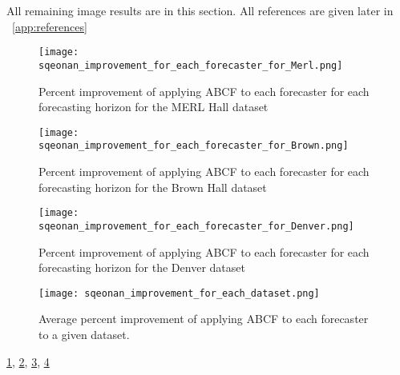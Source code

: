 \label{app:results}
All remaining image results are in this section.  All references are given later in ~\ref{app:references}

\begin{figure}
	\begin{center}
		\texttt{[image: sqeonan\_improvement\_for\_each\_forecaster\_for\_Merl.png]}
	\end{center}
	\caption{Percent improvement of applying ABCF to each forecaster for each forecasting horizon for the MERL Hall dataset}
	\label{fig:merl_sqeonan_improvement}
\end{figure}

\begin{figure}
	\begin{center}
		\texttt{[image: sqeonan\_improvement\_for\_each\_forecaster\_for\_Brown.png]}
	\end{center}
	\caption{Percent improvement of applying ABCF to each forecaster for each forecasting horizon for the Brown Hall dataset}
	\label{fig:brown_sqeonan_improvement}
\end{figure}

\begin{figure}
	\begin{center}
		\texttt{[image: sqeonan\_improvement\_for\_each\_forecaster\_for\_Denver.png]}
	\end{center}
	\caption{Percent improvement of applying ABCF to each forecaster for each forecasting horizon for the Denver dataset}
	\label{fig:denver_sqeonan_improvement}
\end{figure}

\begin{figure}
	\begin{center}
		\texttt{[image: sqeonan\_improvement\_for\_each\_dataset.png]}
	\end{center}
	\caption{Average percent improvement of applying ABCF to each forecaster to a given dataset.}
	\label{fig:sqeonan_improvement_all_dataset}
\end{figure}



\label{app:references}

\ref{fig:merl_sqeonan_improvement},
\ref{fig:brown_sqeonan_improvement},
\ref{fig:denver_sqeonan_improvement},
\ref{fig:sqeonan_improvement_all_dataset}